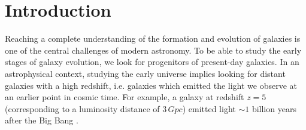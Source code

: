 \section{Introduction}
Reaching a complete understanding of the formation and evolution of galaxies is one of the central challenges of modern astronomy. To be able to study the early stages of galaxy evolution, we look for progenitors of present-day galaxies. In an astrophysical context, studying the early universe implies looking for distant galaxies with a high redshift, i.e. galaxies which emitted the light we observe at an earlier point in cosmic time. For example, a galaxy at redshift $z=5$ (corresponding to a luminosity distance of $3\,\si{Gpc}$) emitted light $\sim1$ billion years after the Big Bang
\cite{2006PASP..118.1711W_calculator}. \\

